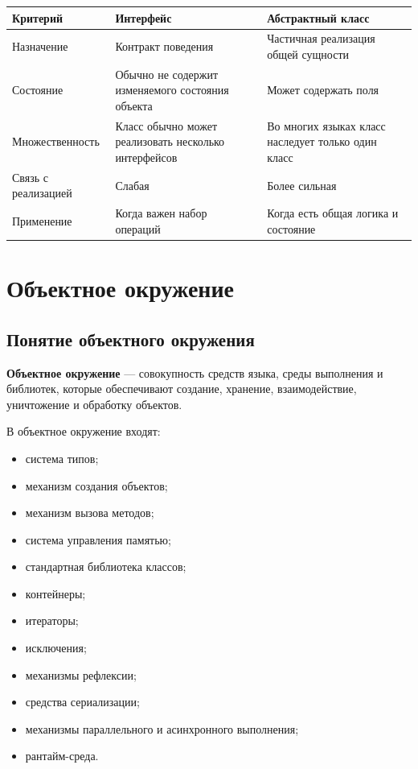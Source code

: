 \documentclass[12pt,a4paper]{article}
\begin{document}
\begin{longtable}{|p{5cm}|p{5cm}|p{5cm}|}
\hline
\textbf{Критерий} & \textbf{Интерфейс} & \textbf{Абстрактный класс} \\
\hline
Назначение & Контракт поведения & Частичная реализация общей сущности \\
\hline
Состояние & Обычно не содержит изменяемого состояния объекта & Может содержать поля \\
\hline
Множественность & Класс обычно может реализовать несколько интерфейсов & Во многих языках класс наследует только один класс \\
\hline
Связь с реализацией & Слабая & Более сильная \\
\hline
Применение & Когда важен набор операций & Когда есть общая логика и состояние \\
\hline
\end{longtable}

\section{Объектное окружение}

\subsection{Понятие объектного окружения}

\textbf{Объектное окружение} --- совокупность средств языка, среды выполнения и библиотек, которые обеспечивают создание, хранение, взаимодействие, уничтожение и обработку объектов.

В объектное окружение входят:
\begin{itemize}
    \item система типов;
    \item механизм создания объектов;
    \item механизм вызова методов;
    \item система управления памятью;
    \item стандартная библиотека классов;
    \item контейнеры;
    \item итераторы;
    \item исключения;
    \item механизмы рефлексии;
    \item средства сериализации;
    \item механизмы параллельного и асинхронного выполнения;
    \item рантайм-среда.
\end{itemize}
\end{document}
